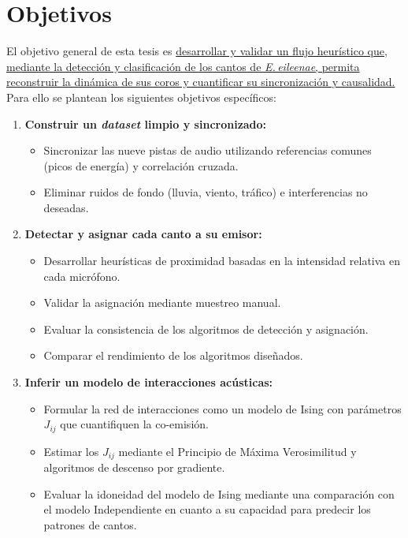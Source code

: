 \section{Objetivos}
\label{sec:objetivos}

El objetivo general de esta tesis es \ul{desarrollar y 
validar un flujo heurístico que, mediante la detección y 
clasificación de los cantos de \emph{E.\,eileenae}, permita 
reconstruir la dinámica de sus coros y cuantificar su 
sincronización y causalidad.}
Para ello se plantean los siguientes objetivos específicos:

\begin{enumerate}
  \item \textbf{Construir un \emph{dataset} limpio y sincronizado:}  
    \begin{itemize}
      \item Sincronizar las nueve pistas de audio utilizando referencias comunes (picos de energía) y correlación cruzada.  \cite{costa2021comparing}
      \item Eliminar ruidos de fondo (lluvia, viento, tráfico) e interferencias no deseadas.
    \end{itemize}
  \item \textbf{Detectar y asignar cada canto a su emisor:}  
    \begin{itemize}
      \item Desarrollar heurísticas de proximidad basadas en la intensidad relativa en cada micrófono.  
      \item Validar la asignación mediante muestreo manual.
      \item Evaluar la consistencia de los algoritmos de detección y asignación.
      \item Comparar el rendimiento de los algoritmos diseñados.
    \end{itemize}
  \item \textbf{Inferir un modelo de interacciones acústicas:}  
    \begin{itemize}
      \item Formular la red de interacciones como un modelo de Ising con parámetros \(J_{ij}\) que cuantifiquen la co-emisión.  
      \item Estimar los \(J_{ij}\) mediante el Principio de Máxima Verosimilitud \cite{fisher1912maximum} y algoritmos de descenso por gradiente.
      \item Evaluar la idoneidad del modelo de Ising mediante una comparación con el modelo Independiente en cuanto a su capacidad para predecir los patrones de cantos.
    \end{itemize}
\end{enumerate}


